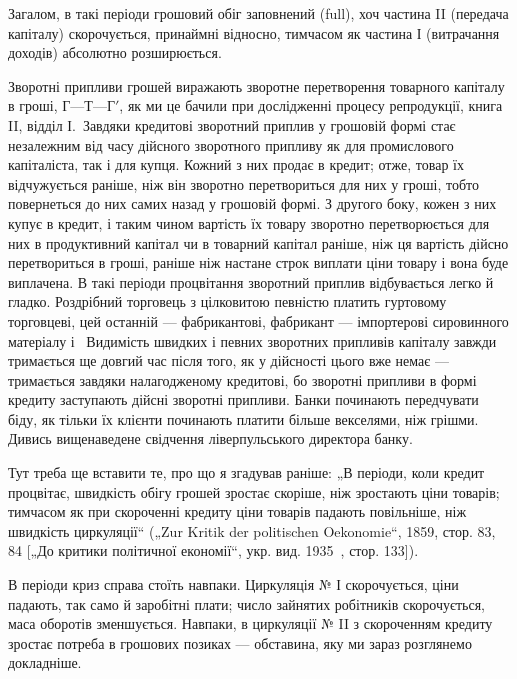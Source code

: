 Загалом, в такі періоди грошовий обіг заповнений (full),
хоч частина II (передача капіталу) скорочується, принаймні
відносно, тимчасом як частина І (витрачання доходів) абсолютно
розширюється.

Зворотні припливи грошей виражають зворотне перетворення
товарного капіталу в гроші, $Г — Т — Г'$, як ми це бачили при
дослідженні процесу репродукції, книга II, відділ І.~Завдяки кредитові
зворотний приплив у грошовій формі стає незалежним
від часу дійсного зворотного припливу як для промислового капіталіста, так і для купця. Кожний з них
продає в кредит; отже,
товар їх відчужується раніше, ніж він зворотно перетвориться
для них у гроші, тобто повернеться до них самих назад у грошовій формі. З другого боку, кожен з них
купує в кредит, і таким
чином вартість їх товару зворотно перетворюється для них
в продуктивний капітал чи в товарний капітал раніше, ніж ця вартість дійсно перетвориться в гроші,
раніше ніж настане строк виплати ціни товару і вона буде виплачена. В такі періоди процвітання
зворотний приплив відбувається легко й гладко. Роздрібний
торговець з цілковитою певністю платить гуртовому торговцеві,
цей останній — фабрикантові, фабрикант — імпортерові сировинного матеріалу і~ Видимість швидких
і певних зворотних припливів капіталу завжди тримається ще довгий час після того, як у
дійсності цього вже немає — тримається завдяки налагодженому
кредитові, бо зворотні припливи в формі кредиту заступають
дійсні зворотні припливи. Банки починають передчувати біду,
як тільки їх клієнти починають платити більше векселями, ніж
грішми. Дивись вищенаведене свідчення ліверпульського директора банку.

Тут треба ще вставити те, про що я згадував раніше: „В періоди,
коли кредит процвітає, швидкість обігу грошей зростає скоріше,
ніж зростають ціни товарів; тимчасом як при скороченні кредиту ціни товарів падають повільніше, ніж
швидкість циркуляції“
(„Zur Kritik der politischen Oekonomie“, 1859, стор. 83, 84 [„До
критики політичної економії“, укр. вид. 1935~, стор. 133]).

В періоди криз справа стоїть навпаки. Циркуляція № І скорочується, ціни падають, так само й
заробітні плати; число зайнятих робітників скорочується, маса оборотів зменшується. Навпаки, в
циркуляції № II з скороченням кредиту зростає потреба
в грошових позиках — обставина, яку ми зараз розглянемо докладніше.

